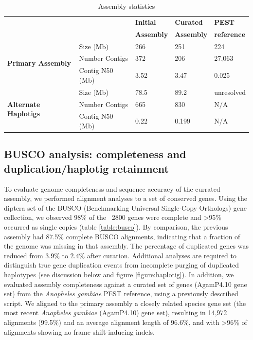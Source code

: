 \begin{table}[htbp!]
\caption{Assembly statistics}\label{table:assemblydata}
\begin{center}
\begin{tabular}{ | l | l | l | l | l |}
\hline
\multicolumn{2}{|c|}{} & \textbf{Initial} & \textbf{Curated} & \textbf{PEST} \\
\multicolumn{2}{|c|}{} & \textbf{Assembly} & \textbf{Assembly} & \textbf{reference} \\
\hline
\multirow{3}{5em}{\textbf{Primary Assembly}}
& Size (Mb) & 266 & 251 & 224 \\
\cline{2-5}
& Number Contigs & 372 & 206 & 27,063 \\
\cline{2-5}
& Contig N50 (Mb) & 3.52	& 3.47	& 0.025 \\
\hline%
\multirow{3}{5em}{\textbf{Alternate Haplotigs}}
& Size (Mb) & 78.5 & 	89.2	& unresolved \\
\cline{2-5}
& Number Contigs & 665 &	830& 	N/A \\
\cline{2-5}
& Contig N50 (Mb) & 0.22	& 0.199	& N/A \\
\hline
\end{tabular}
\end{center}
\end{table}




\subsection{BUSCO analysis: completeness and duplication/haplotig retainment}

\par{
To evaluate genome completeness and sequence accuracy of the currated assembly, we performed alignment analyses to a set of conserved genes. Using the diptera set of the BUSCO (Benchmarking Universal Single-Copy Orthologs) gene collection, we observed 98\% of the ~2800 genes were complete and >95\% occurred as single copies (table \ref{table:busco}). By comparison, the previous assembly had 87.5\% complete BUSCO alignments, indicating that a fraction of the genome was missing in that assembly. The percentage of duplicated genes was reduced from 3.9\% to 2.4\% after curation.  Additional analyses are required to distinguish true gene duplication events from incomplete purging of duplicated haplotypes (see discussion below and figure \ref{figure:haplotig}). In addition, we evaluated assembly completeness against a curated set of genes (AgamP4.10 gene set) from the \textit{Anopheles gambiae} PEST reference, using a previously described script\cite{avian}. We aligned to the primary assembly a closely related species gene set (the most recent \textit{Anopheles gambiae} (AgamP4.10) gene set), resulting in 14,972 alignments (99.5\%) and an average alignment length of 96.6\%, and with >96\% of alignments showing no frame shift-inducing indels.
}


